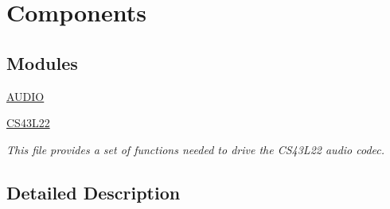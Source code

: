 \hypertarget{group___components}{}\section{Components}
\label{group___components}
\subsection*{Modules}
\begin{DoxyCompactItemize}
\item 
\mbox{\hyperlink{group___a_u_d_i_o}{A\+U\+D\+IO}}
\item 
\mbox{\hyperlink{group___c_s43_l22}{C\+S43\+L22}}
\begin{DoxyCompactList}\small\item\em This file provides a set of functions needed to drive the C\+S43\+L22 audio codec. \end{DoxyCompactList}\end{DoxyCompactItemize}


\subsection{Detailed Description}
